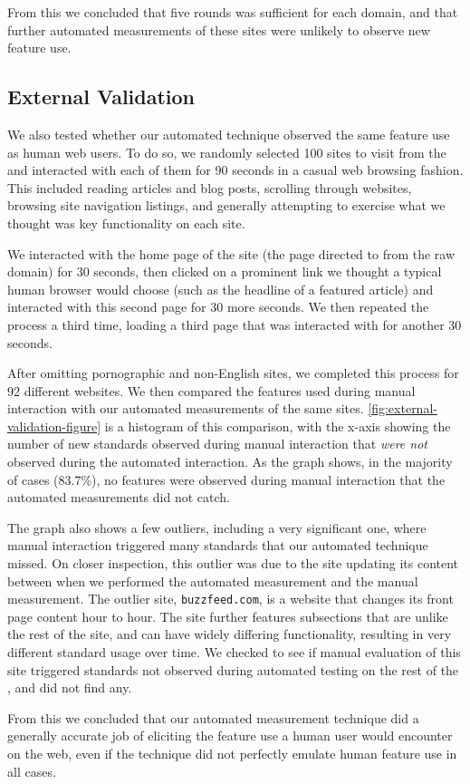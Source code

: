 From this we concluded that five rounds was sufficient for each domain, and
that further automated measurements of these sites were unlikely to observe new
feature use.


\subsection{External Validation}
\label{measurement:validity:external-validation}

We also tested whether our automated technique observed the same feature
use as human web users.  To do so, we randomly selected 100 sites to visit
from the \ATK and interacted with each of them for 90 seconds in a casual
web browsing fashion.  This included reading articles and blog posts, scrolling
through websites, browsing site navigation listings, and generally attempting
to exercise what we thought was key functionality on each site.

We interacted with the home page of the site (the page directed to from the raw
domain) for 30 seconds, then clicked on a prominent link we thought a typical
human browser would choose (such as the headline of a featured article) and
interacted with this second page for 30 more seconds.  We then repeated the
process a third time, loading a third page that was interacted with for another
30 seconds.

After omitting pornographic and non-English sites, we completed this process
for 92 different websites. We then compared the features used during manual
interaction with our automated measurements of the same sites.
\ref{fig:external-validation-figure} is a histogram of this
comparison, with the x-axis showing the number of new standards
observed during manual interaction that \textit{were not} observed during
the automated interaction.  As the graph shows, in the majority of cases
(83.7\%), no features were observed during manual interaction that the
automated measurements did not catch.

The graph also shows a few outliers, including a very significant one, where
manual interaction triggered many standards that our automated technique
missed.  On closer inspection, this outlier was due to the site updating its
content between when we performed the automated measurement and the manual
measurement.  The outlier site, \texttt{buzzfeed.com}, is a website that
changes its front page content hour to hour.  The site further features
subsections that are unlike the rest of the site, and can have widely differing
functionality, resulting in very different standard usage over time. We checked
to see if manual evaluation of this site triggered standards not
observed during automated testing on the rest of the \ATK, and did not
find any.

From this we concluded that our automated measurement technique did a generally
accurate job of eliciting the feature use a human user would encounter on the
web, even if the technique did not perfectly emulate human feature use in all
cases.

